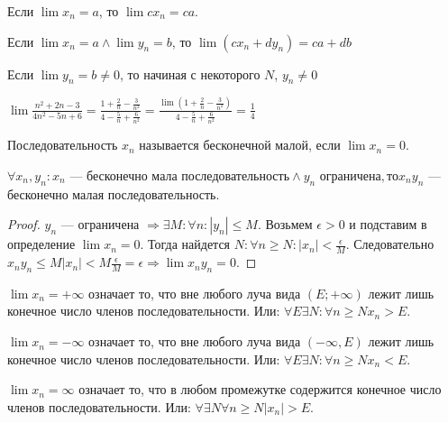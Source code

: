 \begin{consequence}
   Если $\lim x_n = a$, то  $\lim cx_n = ca$. 
\end{consequence}
\begin{consequence}
    Если $\lim x_n=a \land \lim y_n = b$, то $\lim(cx_n+dy_n) = ca+db$
\end{consequence}
 \begin{remark}
    Если $\lim y_n = b \neq 0$, то начиная с некоторого  $N$,  $y_n \neq 0$
\end{remark}
\begin{example}
    $\lim \frac{n^2+2n-3}{4n^2-5n+6} = \frac{1 + \frac{2}{n} - \frac{3}{n^2}}{4-\frac{5}{n}+\frac{6}{n^2}} = \frac{\lim(1+\frac{2}{n}-\frac{3}{n^2})}{4 - \frac{5}{n}+\frac{6}{n^2}} = \frac{1}{4}$
\end{example}
\begin{definition}
    Последовательность $x_n$ называется бесконечной малой, если $\lim x_n=0$.
\end{definition}
\begin{statement}
    $\forall x_n, y_n: x_n\text{ --- бесконечно мала последовательность} \land y_n\text{ ограничена}, то x_ny_n$ --- бесконечно малая последовательность.
\end{statement}
\begin{proof}
    $y_n$ --- ограничена  $\Rightarrow \exists M: \forall n: |y_n| \le M$. Возьмем $\epsilon > 0$ и подставим в определение  $\lim x_n = 0$. Тогда найдется  $N: \forall n \ge N: |x_n| < \frac{\epsilon}{M}$. Следовательно $x_ny_n \le M |x_n| < M \frac{\epsilon}{M} = \epsilon \Rightarrow \lim x_n y_n = 0$.
\end{proof}
\begin{definition}
    $\lim x_n = +\infty$ означает то, что вне любого луча вида  $(E; +\infty)$ лежит лишь конечное число членов последовательности. Или:  $\forall E \exists N: \forall n \ge N x_n > E$.
\end{definition}
\begin{definition}
    $\lim x_n = -\infty$ означает то, что вне любого луча вида  $(-\infty, E)$ лежит лишь конечное число членов последовательности. Или:  $\forall E \exists N: \forall n \ge N x_n < E$.
\end{definition}
\begin{definition}
    $\lim x_n = \infty$ означает то, что в любом промежутке содержится конечное число членов последовательности. Или:  $\forall \exists N \forall n \ge N |x_n| > E$.
\end{definition}
